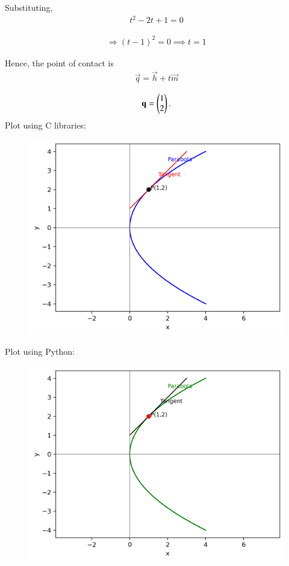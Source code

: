 \documentclass[journal,12pt,onecolumn]{IEEEtran}
\begin{document}
Substituting,
\begin{align}
t^2 - 2t + 1 = 0
\end{align}

\begin{align}
\Rightarrow (t - 1)^2 = 0 \implies t = 1
\end{align}

Hence, the point of contact is
\begin{align}
\vec{q} = \vec{h} + t\vec{m} 
\end{align}

\begin{align}
 \mathbf{q} = \begin{pmatrix}1 \\ 2\end{pmatrix}.
\end{align}
Plot using C libraries:
\begin{figure}[H]
	\centering
	\includegraphics[scale=0.5]{img1}
	\caption*{}
	\label{img1}
\end{figure}
Plot using Python:
\begin{figure}[H]
	\centering
	\includegraphics[scale=0.5]{img2}
	\caption*{}
	\label{img2}
\end{figure}
\end{document}
